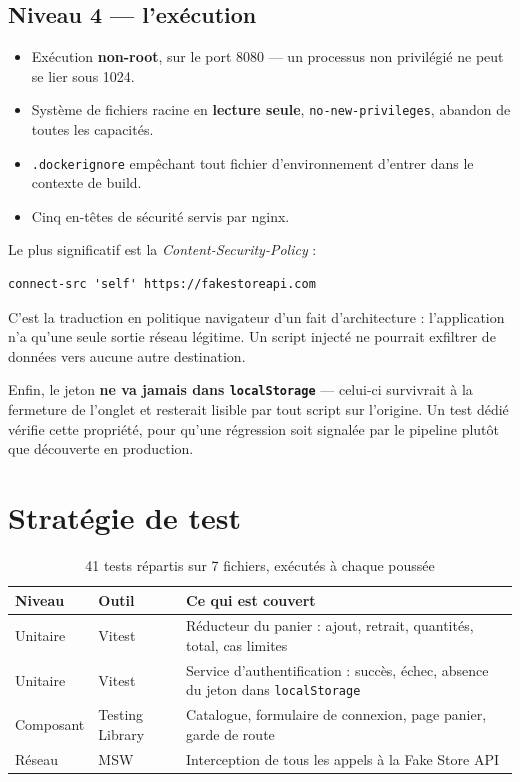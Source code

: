 \documentclass[11pt,a4paper]{article}
\begin{document}
\subsection{Niveau 4 — l'exécution}

\begin{itemize}
  \item Exécution \textbf{non-root}, sur le port 8080 — un processus non
        privilégié ne peut se lier sous 1024.
  \item Système de fichiers racine en \textbf{lecture seule},
        \texttt{no-new-privileges}, abandon de toutes les capacités.
  \item \texttt{.dockerignore} empêchant tout fichier d'environnement
        d'entrer dans le contexte de build.
  \item Cinq en-têtes de sécurité servis par nginx.
\end{itemize}

Le plus significatif est la \textit{Content-Security-Policy} :

\begin{lstlisting}
connect-src 'self' https://fakestoreapi.com
\end{lstlisting}

C'est la traduction en politique navigateur d'un fait d'architecture :
l'application n'a qu'une seule sortie réseau légitime. Un script injecté ne
pourrait exfiltrer de données vers aucune autre destination.

Enfin, le jeton \textbf{ne va jamais dans \texttt{localStorage}} — celui-ci
survivrait à la fermeture de l'onglet et resterait lisible par tout script
sur l'origine. Un test dédié vérifie cette propriété, pour qu'une régression
soit signalée par le pipeline plutôt que découverte en production.

\section{Stratégie de test}

\begin{table}[htbp]
\centering
\begin{tabularx}{\linewidth}{@{}l l X@{}}
\toprule
\textbf{Niveau} & \textbf{Outil} & \textbf{Ce qui est couvert} \\
\midrule
Unitaire & Vitest & Réducteur du panier : ajout, retrait, quantités, total, cas limites \\
Unitaire & Vitest & Service d'authentification : succès, échec, absence du jeton dans \texttt{localStorage} \\
Composant & Testing Library & Catalogue, formulaire de connexion, page panier, garde de route \\
Réseau & MSW & Interception de tous les appels à la Fake Store API \\
\bottomrule
\end{tabularx}
\caption{41 tests répartis sur 7 fichiers, exécutés à chaque poussée}
\end{table}
\end{document}
